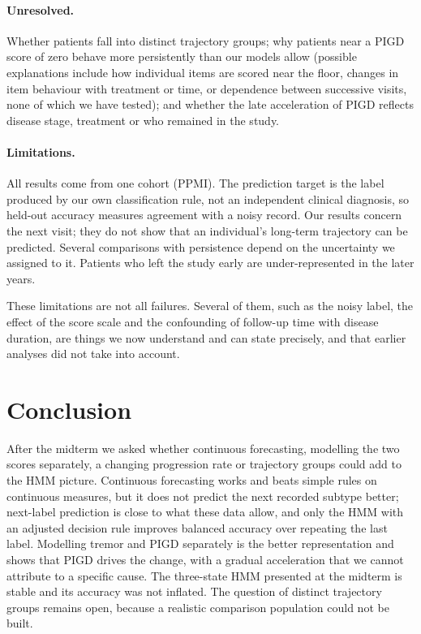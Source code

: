 \documentclass[11pt,a4paper]{article}
\begin{document}
\paragraph{Unresolved.} Whether patients fall into distinct trajectory groups;
why patients near a PIGD score of zero behave more persistently than our models
allow (possible explanations include how individual items are scored near the
floor, changes in item behaviour with treatment or time, or dependence between
successive visits, none of which we have tested); and whether the late
acceleration of PIGD reflects disease stage, treatment or who remained in the
study.

\paragraph{Limitations.} All results come from one cohort (PPMI). The
prediction target is the label produced by our own classification rule, not an
independent clinical diagnosis, so held-out accuracy measures agreement with a
noisy record. Our results concern the next visit; they do not show that an
individual's long-term trajectory can be predicted. Several comparisons with
persistence depend on the uncertainty we assigned to it. Patients who left the
study early are under-represented in the later years.

These limitations are not all failures. Several of them, such as the noisy
label, the effect of the score scale and the confounding of follow-up time with
disease duration, are things we now understand and can state precisely, and
that earlier analyses did not take into account.

\section{Conclusion}

After the midterm we asked whether continuous forecasting, modelling the two
scores separately, a changing progression rate or trajectory groups could add
to the HMM picture. Continuous forecasting works and beats simple rules on
continuous measures, but it does not predict the next recorded subtype better;
next-label prediction is close to what these data allow, and only the HMM with
an adjusted decision rule improves balanced accuracy over repeating the last
label. Modelling tremor and PIGD separately is the better representation and
shows that PIGD drives the change, with a gradual acceleration that we cannot
attribute to a specific cause. The three-state HMM presented at the midterm is
stable and its accuracy was not inflated. The question of distinct trajectory
groups remains open, because a realistic comparison population could not be
built.
\end{document}
